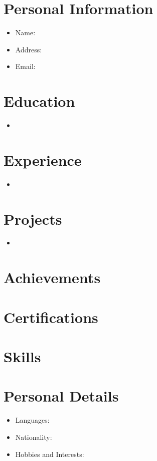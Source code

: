 \documentclass{article}
\begin{document}
\section*{Personal Information}
\begin{itemize}
    \item Name: 
    \item Address: 
    \item Email: 
\end{itemize}

\section*{Education}
\begin{itemize}
    \item {}
\end{itemize}

\section*{Experience}
\begin{itemize}
    \item {}
\end{itemize}

\section*{Projects}
\begin{itemize}
    \item {}
\end{itemize}

\section*{Achievements}

\section*{Certifications}

\section*{Skills}

\section*{Personal Details}
\begin{itemize}
    \item Languages: 
    \item Nationality: 
    \item Hobbies and Interests: 
\end{itemize}
\end{document}
